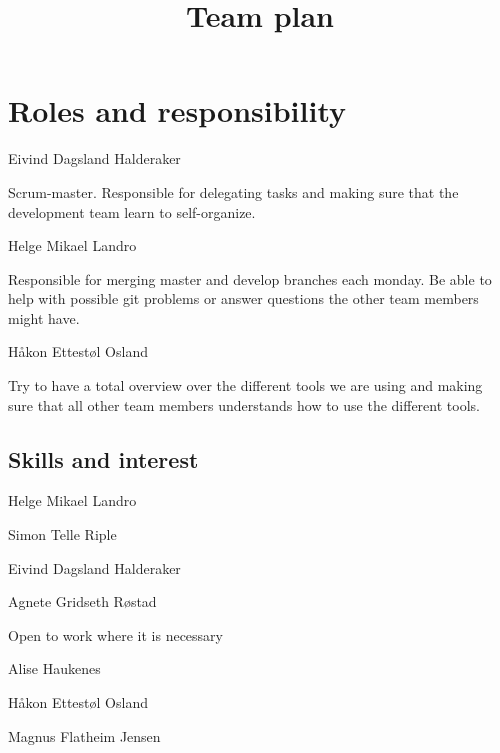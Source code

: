 \documentclass{article}
\title{Team plan}
\begin{document}
\date{}
\maketitle
{}

\section*{Roles and responsibility}
\begin{description}[align=right]
\item [Leader:] \hspace{6 mm} Eivind Dagsland Halderaker
\item \hspace*{4 mm} Scrum-master. Responsible for delegating tasks and making sure that the development team learn to self-organize. 
\item [Git repo:] \hspace{6 mm} Helge Mikael Landro
\item \hspace*{4 mm} Responsible for merging master and develop branches each monday. Be able to help with possible git problems or answer questions the other team members might have.
\item [Tools:] \hspace{6 mm} Håkon Ettestøl Osland
\item \hspace*{4 mm} Try to have a total overview over the different tools we are using and making sure that all other team members understands how to use the different tools.
\end{description}

\subsection*{Skills and interest}
\begin{description}[align=right]
\item [Front end]
\item Helge Mikael Landro
\item Simon Telle Riple
\item [Back end]
\item Eivind Dagsland Halderaker
\item Agnete Gridseth Røstad
\item [Undecided]
\item Open to work where it is necessary
\item Alise Haukenes
\item Håkon Ettestøl Osland
\item Magnus Flatheim Jensen
\end{description}
\end{document}
